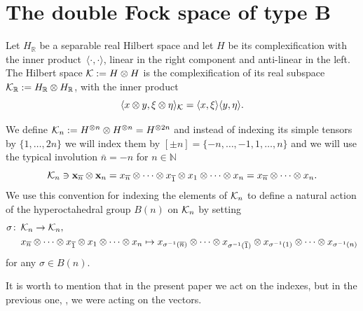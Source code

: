 \documentclass[11pt]{article}
\numberwithin{equation}{section}
\numberwithin{equation}{section}
\def\R{{\mathbb R}}
\def\N{{\mathbb N}}
\def\H{{\bf \mathcal K}_{ n}}
\def\HH{{\bf \mathcal K}}
\begin{document}
\section{The double Fock space of type B}

Let $H_\R$ be a separable real Hilbert space and let $H$ be its
complexification with the inner product~$\langle\cdot,\cdot\rangle$, linear in the right component and anti-linear in the left.
The Hilbert space $\HH:=H\otimes {H}$ is the complexification of its
real subspace $\HH_\R:=H_\R\otimes {H}_\R$, with the inner product
\[
\langle x\otimes y,\xi\otimes \eta \rangle_{\HH} = \langle
x,\xi\rangle\langle y,\eta\rangle.
\]

We define $\H:=H^{\otimes n} \otimes {{H}^{\otimes n}}=H^{\otimes 2n}$ and instead of
indexing its simple tensors by $\{1,\dots,2n\}$ we will index them by $[\pm n]=\{-n,\dots,-1,1,\dots,n\}$ and we will use the
typical involution $\bar n=-n$ for $n\in \N$
\[
\H\ni\mathbf{x}_{\overline n} \otimes \mathbf{x}_n=x_{\overline n}\otimes\cdots \otimes x_{\overline 1} \otimes x_1\otimes\cdots \otimes x_n=x_{\overline n}\otimes \cdots \otimes x_{n}.
\]
We use this convention for indexing the elements of $\H$ to define a natural action of the
hyperoctahedral group $B(n)$ on $\H$ by setting
\begin{align*}
\sigma\colon\, &\H\to \H,
\\
	&x_{\overline n}\otimes\cdots \otimes x_{\overline 1} \otimes x_1\otimes\cdots \otimes x_n\mapsto x_{\sigma^{-1}(\overline n)}\otimes\cdots \otimes x_{\sigma^{-1}(\overline 1)} \otimes x_{\sigma^{-1}(1)}\otimes\cdots \otimes x_{\sigma^{-1}(n)}
\end{align*}
for any $\sigma \in B(n)$.

\begin{Remark}
	It is worth to mention that in the present paper we act on the indexes, but in the previous one, \cite{BozejkoEjsmontHasebe2015}, we were acting on the vectors.
\end{Remark}
\end{document}
